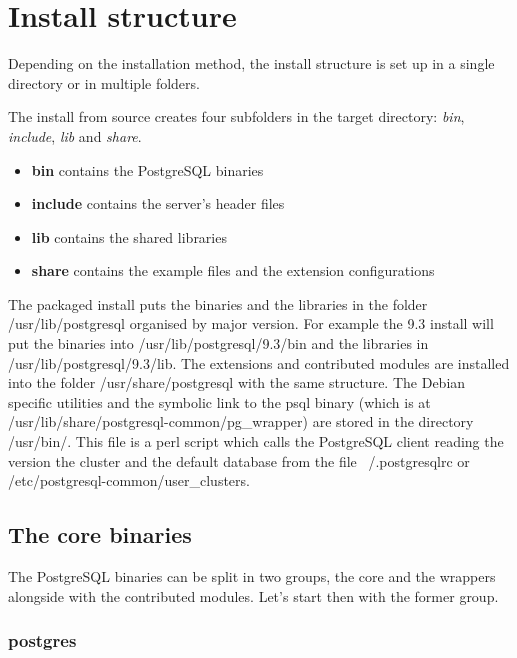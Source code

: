 \chapter{Install structure}\label{cha:INSTALLSTRUCT}

Depending on the installation method, the install structure is set up in a
single directory or in multiple folders.\newline

The install from source creates four subfolders in the target directory:
\textit{bin}, \textit{include}, \textit{lib} and \textit{share}.

\begin{itemize}

    \item \textbf{bin} contains the PostgreSQL binaries
    \item \textbf{include} contains the server's header files
    \item \textbf{lib} contains the shared libraries
    \item \textbf{share} contains the example files and the extension configurations

\end{itemize}

The packaged install puts the binaries and the libraries in the folder
/usr/lib/postgresql organised by major version. For example the 9.3 install
will put the binaries into /usr/lib/postgresql/9.3/bin and the libraries in
/usr/lib/postgresql/9.3/lib. The extensions and contributed modules are
installed into the folder /usr/share/postgresql with the same structure. The
Debian specific utilities and the symbolic link to the psql binary (which is at
/usr/lib/share/postgresql-common/pg\_wrapper) are stored in the directory
/usr/bin/. This file is a perl script which calls the PostgreSQL client reading
the version the cluster and the default database from the file ~/.postgresqlrc
or /etc/postgresql-common/user\_clusters.\newline

\section{The core binaries}

The PostgreSQL binaries can be split in two groups, the core and the wrappers
alongside with the contributed modules. Let's start then with the former group.

\subsection{postgres}

